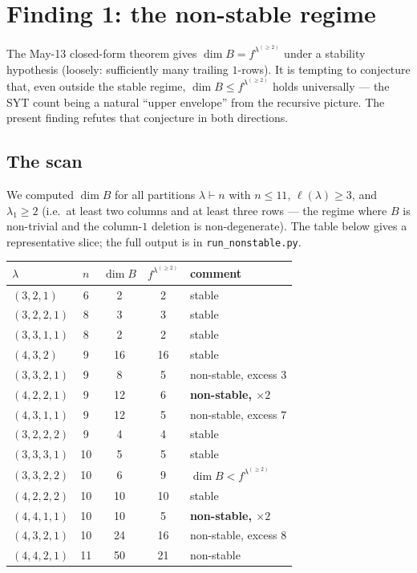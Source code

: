 \documentclass[11pt]{article}
\theoremstyle{definition}
\begin{document}
\section{Finding 1: the non-stable regime}\label{sec:nonstable}

The May-13 closed-form theorem gives $\dim B = f^{\lambda^{(\ge 2)}}$
under a stability hypothesis (loosely: sufficiently many trailing
$1$-rows). It is tempting to conjecture that, even outside the stable
regime, $\dim B \le f^{\lambda^{(\ge 2)}}$ holds universally --- the SYT
count being a natural ``upper envelope'' from the recursive picture. The
present finding refutes that conjecture in both directions.

\subsection{The scan}

We computed $\dim B$ for all partitions $\lambda \vdash n$ with $n \le
11$, $\ell(\lambda) \ge 3$, and $\lambda_1 \ge 2$ (i.e.\ at least two
columns and at least three rows --- the regime where $B$ is non-trivial
and the column-$1$ deletion is non-degenerate). The table below gives a
representative slice; the full output is in
\texttt{run\_nonstable.py}.

\begin{center}
\renewcommand{\arraystretch}{1.15}
\begin{tabular}{lcccl}
\toprule
$\lambda$        & $n$  & $\dim B$ & $f^{\lambda^{(\ge 2)}}$ & comment \\
\midrule
$(3,2,1)$        & 6   & 2  & 2  & stable \\
$(3,2,2,1)$      & 8   & 3  & 3  & stable \\
$(3,3,1,1)$      & 8   & 2  & 2  & stable \\
$(4,3,2)$        & 9   & 16 & 16 & stable \\
$(3,3,2,1)$      & 9   & 8  & 5  & non-stable, excess $3$ \\
$(4,2,2,1)$      & 9   & 12 & 6  & \textbf{non-stable, $\times 2$} \\
$(4,3,1,1)$      & 9   & 12 & 5  & non-stable, excess $7$ \\
$(3,2,2,2)$      & 9   & 4  & 4  & stable \\
$(3,3,3,1)$      & 10  & 5  & 5  & stable \\
$(3,3,2,2)$      & 10  & 6  & 9  & \textbf{$\dim B < f^{\lambda^{(\ge 2)}}$} \\
$(4,2,2,2)$      & 10  & 10 & 10 & stable \\
$(4,4,1,1)$      & 10  & 10 & 5  & \textbf{non-stable, $\times 2$} \\
$(4,3,2,1)$      & 10  & 24 & 16 & non-stable, excess $8$ \\
$(4,4,2,1)$      & 11  & 50 & 21 & non-stable \\
\bottomrule
\end{tabular}
\end{center}
\end{document}
